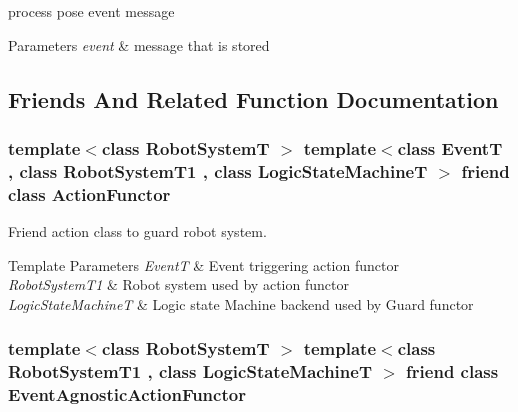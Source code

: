 process pose event message 


\begin{DoxyParams}{Parameters}
{\em event} & message that is stored \\
\hline
\end{DoxyParams}


\subsection{Friends And Related Function Documentation}
\hypertarget{classSampleLogicStateMachine___a05673eb4ec343f36c1f3fb787ac26b94}{
\subsubsection[{Action\-Functor}]{\setlength{\rightskip}{0pt plus 5cm}template$<$class Robot\-System\-T $>$ template$<$class Event\-T , class Robot\-System\-T1 , class Logic\-State\-Machine\-T $>$ friend class {\bf Action\-Functor}\hspace{0.3cm}{\ttfamily [friend]}}}\label{classSampleLogicStateMachine___a05673eb4ec343f36c1f3fb787ac26b94}


Friend action class to guard robot system. 


\begin{DoxyTemplParams}{Template Parameters}
{\em Event\-T} & Event triggering action functor \\
\hline
{\em Robot\-System\-T1} & Robot system used by action functor \\
\hline
{\em Logic\-State\-Machine\-T} & Logic state Machine backend used by Guard functor \\
\hline
\end{DoxyTemplParams}
\hypertarget{classSampleLogicStateMachine___a86a665e36420c3cbc2b45864e023f98a}{
\subsubsection[{Event\-Agnostic\-Action\-Functor}]{\setlength{\rightskip}{0pt plus 5cm}template$<$class Robot\-System\-T $>$ template$<$class Robot\-System\-T1 , class Logic\-State\-Machine\-T $>$ friend class {\bf Event\-Agnostic\-Action\-Functor}\hspace{0.3cm}{\ttfamily [friend]}}}\label{classSampleLogicStateMachine___a86a665e36420c3cbc2b45864e023f98a}


